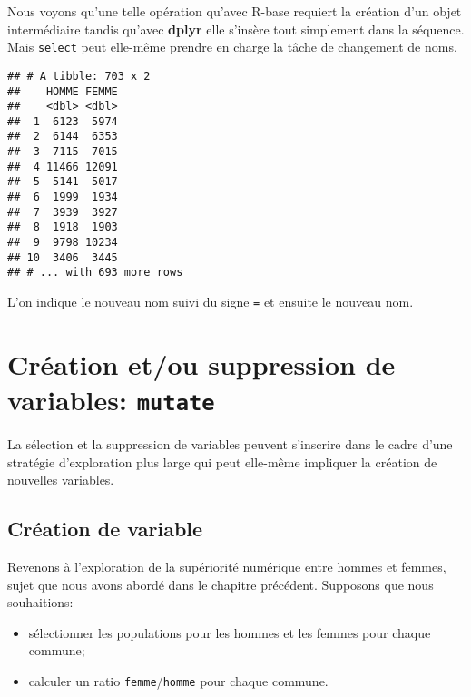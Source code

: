 \documentclass[]{book}
\newenvironment{Shaded}{\begin{snugshade}}{\end{snugshade}}
\newcommand{\KeywordTok}[1]{\textcolor[rgb]{0.13,0.29,0.53}{\textbf{#1}}}
\newcommand{\DataTypeTok}[1]{\textcolor[rgb]{0.13,0.29,0.53}{#1}}
\newcommand{\DecValTok}[1]{\textcolor[rgb]{0.00,0.00,0.81}{#1}}
\newcommand{\StringTok}[1]{\textcolor[rgb]{0.31,0.60,0.02}{#1}}
\newcommand{\CommentTok}[1]{\textcolor[rgb]{0.56,0.35,0.01}{\textit{#1}}}
\newcommand{\OperatorTok}[1]{\textcolor[rgb]{0.81,0.36,0.00}{\textbf{#1}}}
\newcommand{\NormalTok}[1]{#1}
\begin{document}
Nous voyons qu'une telle opération qu'avec R-base requiert la création
d'un objet intermédiaire tandis qu'avec \textbf{dplyr} elle s'insère
tout simplement dans la séquence. Mais \texttt{select} peut elle-même
prendre en charge la tâche de changement de noms.

\begin{Shaded}
\end{Shaded}

\begin{verbatim}
## # A tibble: 703 x 2
##    HOMME FEMME
##    <dbl> <dbl>
##  1  6123  5974
##  2  6144  6353
##  3  7115  7015
##  4 11466 12091
##  5  5141  5017
##  6  1999  1934
##  7  3939  3927
##  8  1918  1903
##  9  9798 10234
## 10  3406  3445
## # ... with 693 more rows
\end{verbatim}

L'on indique le nouveau nom suivi du signe \texttt{=} et ensuite le
nouveau nom.

\section{\texorpdfstring{Création et/ou suppression de variables:
\texttt{mutate}}{Création et/ou suppression de variables: mutate}}\label{creation-etou-suppression-de-variables-mutate}

La sélection et la suppression de variables peuvent s'inscrire dans le
cadre d'une stratégie d'exploration plus large qui peut elle-même
impliquer la création de nouvelles variables.

\subsection{Création de variable}\label{creation-de-variable}

Revenons à l'exploration de la supériorité numérique entre hommes et
femmes, sujet que nous avons abordé dans le chapitre précédent.
Supposons que nous souhaitions:

\begin{itemize}
\item
  sélectionner les populations pour les hommes et les femmes pour chaque
  commune;
\item
  calculer un ratio \texttt{femme}/\texttt{homme} pour chaque commune.
\end{itemize}
\end{document}
